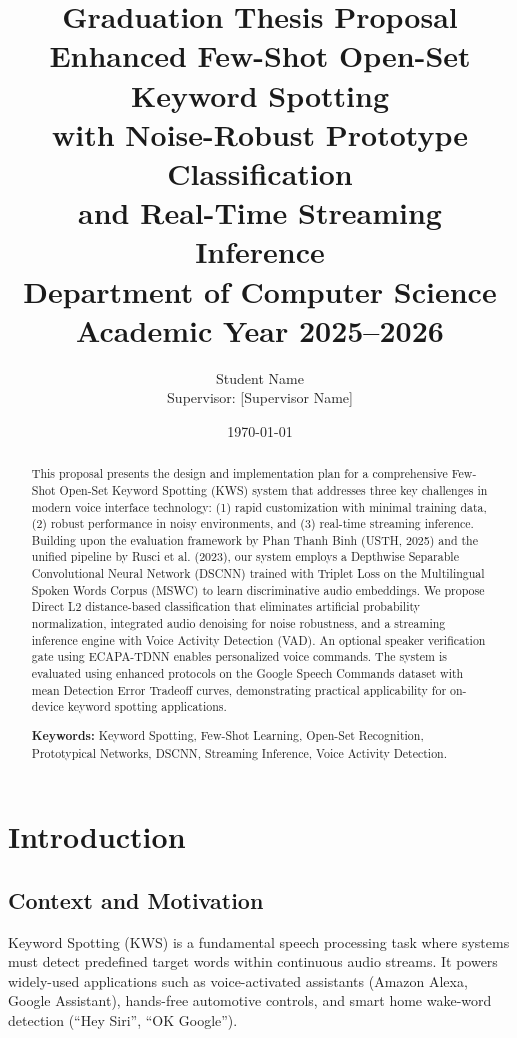 \documentclass[12pt,a4paper]{report}
\title{
    \vspace{-1cm}
    \textbf{Graduation Thesis Proposal} \\[0.5cm]
    \Large\textbf{Enhanced Few-Shot Open-Set Keyword Spotting \\
    with Noise-Robust Prototype Classification \\
    and Real-Time Streaming Inference} \\[1cm]
    \large Department of Computer Science \\
    \large Academic Year 2025--2026
}
\author{Student Name \\ Supervisor: [Supervisor Name]}
\date{\today}
\begin{document}
\maketitle
\thispagestyle{empty}

\begin{abstract}
This proposal presents the design and implementation plan for a comprehensive
Few-Shot Open-Set Keyword Spotting (KWS) system that addresses three key
challenges in modern voice interface technology: (1) rapid customization with
minimal training data, (2) robust performance in noisy environments, and
(3) real-time streaming inference. Building upon the evaluation framework by
Phan Thanh Binh (USTH, 2025) and the unified pipeline by Rusci et al. (2023),
our system employs a Depthwise Separable Convolutional Neural Network (DSCNN)
trained with Triplet Loss on the Multilingual Spoken Words Corpus (MSWC) to
learn discriminative audio embeddings. We propose Direct L2 distance-based
classification that eliminates artificial probability normalization, integrated
audio denoising for noise robustness, and a streaming inference engine with
Voice Activity Detection (VAD). An optional speaker verification gate using
ECAPA-TDNN enables personalized voice commands. The system is evaluated using
enhanced protocols on the Google Speech Commands dataset with mean Detection
Error Tradeoff curves, demonstrating practical applicability for on-device
keyword spotting applications.

\textbf{Keywords:} Keyword Spotting, Few-Shot Learning, Open-Set Recognition,
Prototypical Networks, DSCNN, Streaming Inference, Voice Activity Detection.
\end{abstract}

\tableofcontents
\newpage

\chapter{Introduction}

\section{Context and Motivation}

Keyword Spotting (KWS) is a fundamental speech processing task where systems
must detect predefined target words within continuous audio streams. It powers
widely-used applications such as voice-activated assistants (Amazon Alexa,
Google Assistant), hands-free automotive controls, and smart home wake-word
detection (``Hey Siri'', ``OK Google'').
\end{document}

